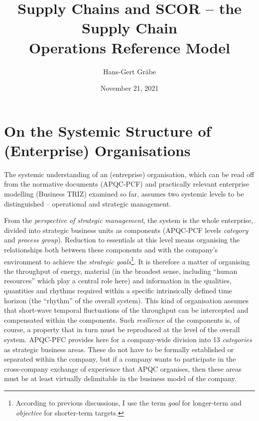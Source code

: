 \documentclass[11pt,a4paper]{article}
\title{Supply Chains and SCOR -- the Supply Chain\\ Operations Reference
  Model}
\author{Hans-Gert Gr\"abe}
\date{November 21, 2021}
\begin{document}
\maketitle

\section{On the Systemic Structure of (Enterprise) Organisations}

The systemic understanding of an (entreprise) organisation, which can be read
off from the normative documents (APQC-PCF) and practically relevant
enterprise modelling (Business TRIZ) examined so far, assumes two systemic
levels to be distinguished -- operational and strategic management.

From the \emph{perspective of strategic management}, the system is the whole
enterprise, divided into strategic business units as components (APQC-PCF
levels \emph{category} and \emph{process group}). Reduction to essentials at
this level means organising the relationships both between these components
and with the company's environment to achieve the \emph{strategic
  goals}\footnote{According to previous discussions, I use the term
  \emph{goal} for longer-term and \emph{objective} for shorter-term targets.}.
It is therefore a matter of organising the throughput of energy, material (in
the broadest sense, including \enquote{human resources} which play a central
role here) and information in the qualities, quantities and rhythms required
within a specific intrinsically defined time horizon (the \enquote{rhythm} of
the overall system). This kind of organisation assumes that short-wave
temporal fluctuations of the throughput can be intercepted and compensated
within the components. Such \emph{resilience} of the components is, of course,
a property that in turn must be reproduced at the level of the overall
system. APQC-PFC provides here for a company-wide division into 13
\emph{categories} as strategic business areas. These do not have to be
formally established or separated within the company, but if a company wants
to participate in the cross-company exchange of experience that APQC
organises, then these areas must be at least virtually delimitable in the
business model of the company.
\end{document}
